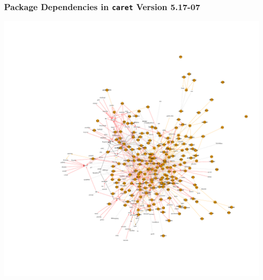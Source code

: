 \documentclass[12 pt]{beamer}\usepackage[]{graphicx}\usepackage[]{color}
\newcommand{\pkg}[1]{{\fontseries{b}\selectfont #1}}
\renewcommand{\pkg}[1]{{\color{darkgreen}\texttt{#1}}}
\begin{document}

  \begin{frame}[fragile]
\frametitle{Package Dependencies in \pkg{caret} Version 5.17-07}
\vspace{-.5in}
  \begin{center}
    \includegraphics[clip, width = .85\textwidth]{old_graph}
  \end{center}

\end{frame}


\end{document}
